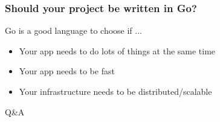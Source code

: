 \documentclass{beamer}
\begin{document}
\begin{frame}
  \frametitle{Should your project be written in Go?}
  Go is a good language to choose if ...
  \begin{itemize}
    \item Your app needs to do lots of things at the same time
    \item Your app needs to be fast
    \item Your infrastructure needs to be distributed/scalable
  \end{itemize}
\end{frame}
\begin{frame}
  \begin{center}
    {\huge Q\&A}
  \end{center}
\end{frame}
\end{document}
